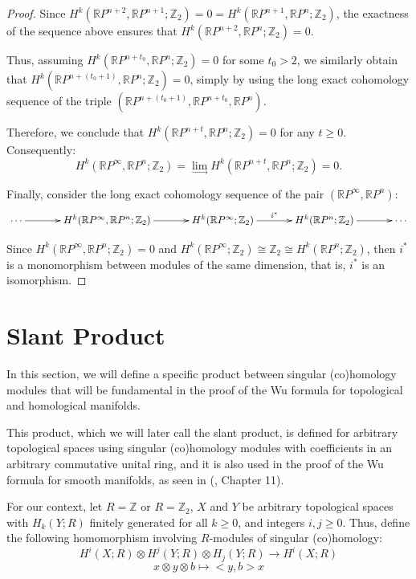 \documentclass[12pt,oneside]{book}
\newcommand{\RP}{\mathbb{R}P}
\newcommand{\Z}{\mathbb{Z}}
\newcommand{\tensor}{\otimes}
\begin{document}
\begin{proof}
    Since $H^{k}(\RP^{n+2},\RP^{n+1};\Z_{2})=0=H^{k}(\RP^{n+1},\RP^{n};\Z_{2})$, the exactness of the sequence above ensures that 
    $H^{k}(\RP^{n+2},\RP^{n};\Z_{2})=0$.
    
    Thus, assuming $H^{k}(\RP^{n+t_{0}},\RP^{n};\Z_{2})=0$ for some $t_{0}>2$, we similarly obtain that 
    $H^{k}(\RP^{n+(t_{0}+1)},\RP^{n};\Z_{2})=0$, simply by using the long exact cohomology sequence of the triple 
    $(\RP^{n+(t_{0}+1)},\RP^{n+t_{0}},\RP^{n})$.
    
    Therefore, we conclude that $H^{k}(\RP^{n+t},\RP^{n};\Z_{2})=0$ for any $t\geq 0$. Consequently:
    $$ H^{k}(\RP^{\infty},\RP^{n};\Z_{2})=\lim_{\longrightarrow}H^{k}(\RP^{n+t},\RP^{n};\Z_{2})=0. $$
    
    Finally, consider the long exact cohomology sequence of the pair $(\RP^{\infty},\RP^{n})$:
    $$
    \xymatrix @C=0.5cm {
    \cdots \ar[rr] && H^{k}(\RP^{\infty},\RP^{n};\Z_{2}) \ar[rr] && H^{k}(\RP^{\infty};\Z_{2}) \ar[rr]^-{i^{*}} && H^{k}(\RP^{n};\Z_{2}) \ar[rr] && \cdots
    }
    $$
    
    Since $H^{k}(\RP^{\infty},\RP^{n};\Z_{2})=0$ and $H^{k}(\RP^{\infty};\Z_{2})\cong\Z_{2}\cong H^{k}(\RP^{n};\Z_{2})$, then $i^{*}$ is a 
    monomorphism between modules of the same dimension, that is, $i^{*}$ is an isomorphism.
    
    \end{proof}



    \section{Slant Product}\label{ap_slant}

    In this section, we will define a specific product between singular (co)homology modules that will be fundamental in the proof of the Wu 
    formula for topological and homological manifolds.

    This product, which we will later call the slant product, is defined for arbitrary topological spaces using singular (co)homology modules 
    with coefficients in an arbitrary commutative unital ring, and it is also used in the proof of the Wu formula for smooth 
    manifolds, as seen in (\cite{milnor_1}, Chapter 11).
    
    For our context, let $R=\Z$ or $R=\Z_{2}$, $X$ and $Y$ be arbitrary topological spaces with $H_{k}(Y;R)$ finitely generated for all 
    $k\geq 0$, and integers $i,j\geq 0$. Thus, define the following homomorphism involving $R$-modules of singular (co)homology:
    $$ H^{i}(X;R)\tensor H^{j}(Y;R)\tensor H_{j}(Y;R)\to H^{i}(X;R) $$
    $$ x\tensor y\tensor b\mapsto <y,b>x $$
    
\end{document}
